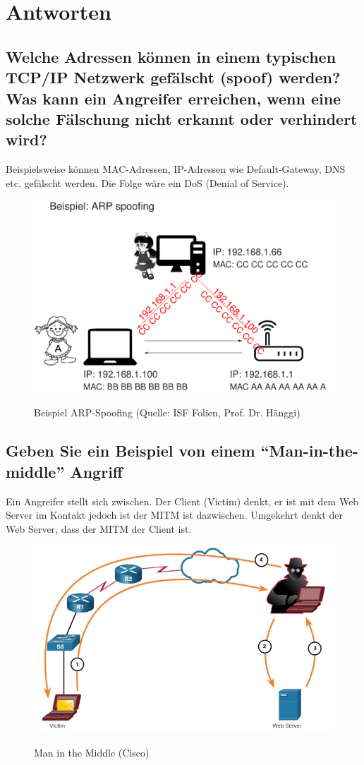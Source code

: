 \section{Antworten}
\subsection*{Welche Adressen können in einem typischen TCP/IP Netzwerk gefälscht (spoof) werden? Was kann ein Angreifer erreichen, wenn eine solche Fälschung nicht erkannt oder verhindert wird?}
Beispielsweise können MAC-Adressen, IP-Adressen wie Default-Gateway, DNS etc. gefälscht werden. Die Folge wäre ein DoS (Denial of Service).

\begin{figure}[H]
    \begin{center}
    \label{pic:Spoofing}
    \includegraphics[width=.75\textwidth]{images/ARP_Spoofing.png}
    \caption{Beispiel ARP-Spoofing (Quelle: ISF Folien, Prof. Dr. Hänggi)}
    \end{center}
\end{figure}

\subsection*{Geben Sie ein Beispiel von einem "`Man-in-the-middle"' Angriff}
Ein Angreifer stellt sich zwischen. Der Client (Victim) denkt, er ist mit dem Web Server im Kontakt jedoch ist der MITM ist dazwischen. Umgekehrt denkt der Web Server, dass der MITM der Client ist.
\begin{figure}[H]
    \begin{center}
    \label{pic:MITM}
    \includegraphics[width=.9\textwidth]{images/mitm.jpg}
    \caption{Man in the Middle (\textsuperscript{\textcopyright}Cisco)}
    \end{center}
\end{figure}

